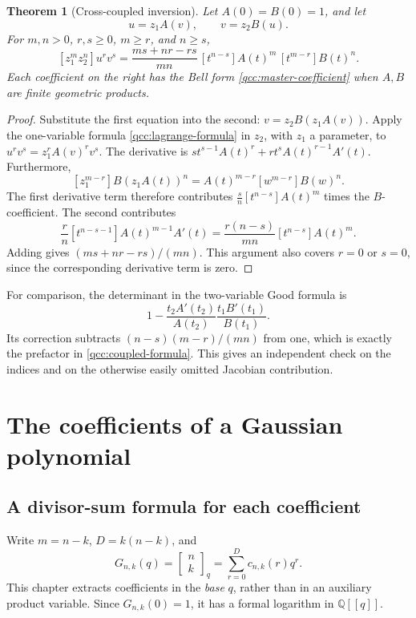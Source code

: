 \documentclass[11pt,a4paper,oneside,openany]{book}
\newtheorem{theorem}{Theorem}[chapter]
\theoremstyle{definition}
\theoremstyle{remark}
\newcommand{\Q}{\mathbb Q}
\newcommand{\GB}[3][q]{\begin{bmatrix}#2\\#3\end{bmatrix}_{#1}}
\begin{document}
\begin{theorem}[Cross-coupled inversion]\label{qcc:coupled}
Let \(A(0)=B(0)=1\), and let
\[
 u=z_1A(v),\qquad v=z_2B(u).
\]
For \(m,n>0\), \(r,s\ge0\), \(m\ge r\), and \(n\ge s\),
\begin{equation}\label{qcc:coupled-formula}
 [z_1^mz_2^n]u^rv^s
 =\frac{ms+nr-rs}{mn}\,
 [t^{n-s}]A(t)^m\,[t^{m-r}]B(t)^n.
\end{equation}
Each coefficient on the right has the Bell form
\eqref{qcc:master-coefficient} when \(A,B\) are finite geometric products.
\end{theorem}
\begin{proof}
Substitute the first equation into the second:
\(v=z_2B(z_1A(v))\). Apply the one-variable formula
\eqref{qcc:lagrange-formula} in \(z_2\), with \(z_1\) a parameter, to
\(u^rv^s=z_1^rA(v)^rv^s\). The derivative is
\(s t^{s-1}A(t)^r+r t^sA(t)^{r-1}A'(t)\).
Furthermore,
\[
 [z_1^{m-r}]B(z_1A(t))^n
 =A(t)^{m-r}[w^{m-r}]B(w)^n.
\]
The first derivative term therefore contributes
\(\frac{s}{n}[t^{n-s}]A(t)^m\) times the \(B\)-coefficient. The second
contributes
\[
 \frac{r}{n}[t^{n-s-1}]A(t)^{m-1}A'(t)
 =\frac{r(n-s)}{mn}[t^{n-s}]A(t)^m.
\]
Adding gives \((ms+nr-rs)/(mn)\). This argument also covers \(r=0\) or
\(s=0\), since the corresponding derivative term is zero.
\end{proof}
For comparison, the determinant in the two-variable Good formula is
\[
 1-\frac{t_2A'(t_2)}{A(t_2)}\frac{t_1B'(t_1)}{B(t_1)}.
\]
Its correction subtracts \((n-s)(m-r)/(mn)\) from one, which is exactly the
prefactor in \eqref{qcc:coupled-formula}. This gives an independent check on the
indices and on the otherwise easily omitted Jacobian contribution.

\chapter{The coefficients of a Gaussian polynomial}
\label{qcc:gaussian-coefficients}
\section{A divisor-sum formula for each coefficient}
Write \(m=n-k\), \(D=k(n-k)\), and
\[
 G_{n,k}(q)=\GB nk=\sum_{r=0}^D c_{n,k}(r)q^r.
\]
This chapter extracts coefficients in the \emph{base} \(q\), rather than in an
auxiliary product variable. Since \(G_{n,k}(0)=1\), it has a formal logarithm
in \(\Q[[q]]\).
\end{document}
